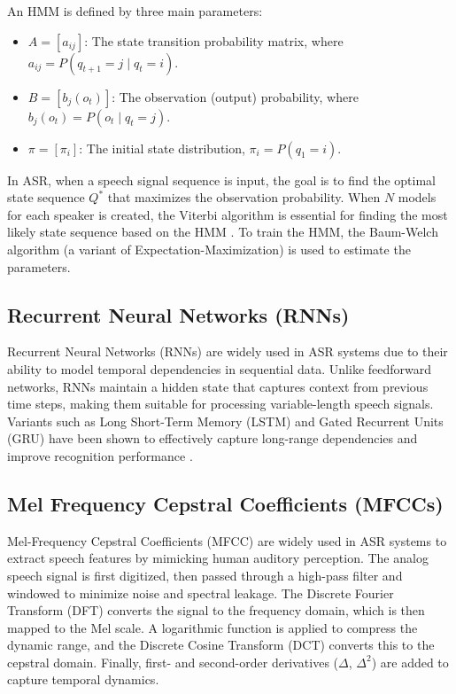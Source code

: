 \documentclass[conference]{IEEEtran}
\begin{document}
An HMM is defined by three main parameters:
\begin{itemize}
    \item $A = [a_{ij}]$: The state transition probability matrix, where $a_{ij} = P(q_{t+1} = j \mid q_t = i)$.
    \item $B = [b_j(o_t)]$: The observation (output) probability, where $b_j(o_t) = P(o_t \mid q_t = j)$.
    \item $\pi = [\pi_i]$: The initial state distribution, $\pi_i = P(q_1 = i)$.
\end{itemize}

In ASR, when a speech signal sequence is input, the goal is to find the optimal state sequence $Q^*$ that maximizes
the observation probability. When \(N\) models for each speaker is created, the Viterbi algorithm is
essential for finding the most likely state sequence based on the HMM \cite{ilyas2007speaker}.
To train the HMM, the Baum-Welch algorithm (a variant of Expectation-Maximization) is used to estimate the parameters.






\subsection{Recurrent Neural Networks (RNNs)}

Recurrent Neural Networks (RNNs) are widely used in ASR systems due to their ability to model temporal dependencies in sequential data. Unlike feedforward networks, RNNs maintain a hidden state that captures context from previous time steps, making them suitable for processing variable-length speech signals. Variants such as Long Short-Term Memory (LSTM) and Gated Recurrent Units (GRU) have been shown to effectively capture long-range dependencies and improve recognition performance \cite{graves2013speech}.

\subsection{Mel Frequency Cepstral Coefficients (MFCCs)}
Mel-Frequency Cepstral Coefficients (MFCC) are widely used in ASR systems to extract speech features by
mimicking human auditory perception. The analog speech signal is first digitized, then passed through a
high-pass filter and windowed to minimize noise and spectral leakage. The Discrete Fourier Transform (DFT)
converts the signal to the frequency domain, which is then mapped to the Mel scale. A logarithmic function
is applied to compress the dynamic range, and the Discrete Cosine Transform (DCT) converts this to the cepstral
domain. Finally, first- and second-order derivatives ($\Delta$, $\Delta^2$) are added to capture temporal dynamics. \cite{davis1980comparison}
\end{document}
